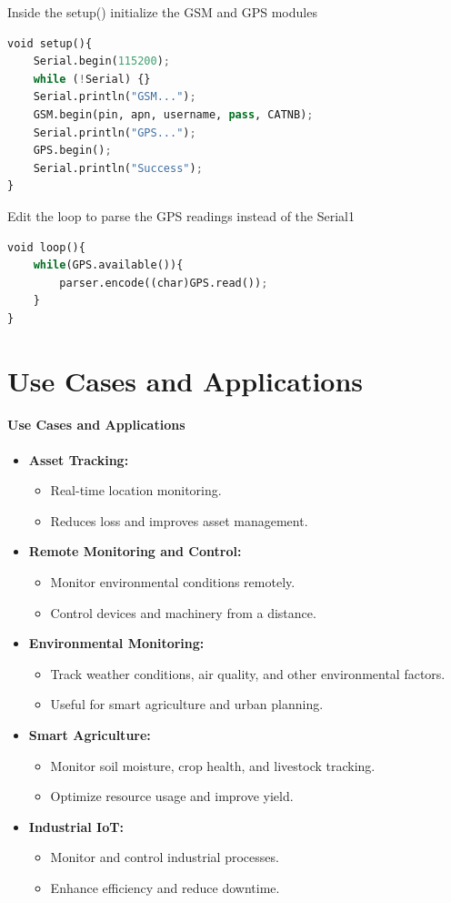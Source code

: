 \begin{frame}[fragile]{Inside the setup() initialize the GSM and GPS modules}
	
	\begin{lstlisting}[language=Python]
void setup(){
	Serial.begin(115200);
	while (!Serial) {}
	Serial.println("GSM...");
	GSM.begin(pin, apn, username, pass, CATNB);
	Serial.println("GPS...");
	GPS.begin();
	Serial.println("Success");
}
	\end{lstlisting}
\end{frame}

\begin{frame}[fragile]{Edit the loop to parse the GPS readings instead of the Serial1}
	
	\begin{lstlisting}[language=Python]
void loop(){
	while(GPS.available()){
		parser.encode((char)GPS.read());
	}
}
	\end{lstlisting}
\end{frame}


\section{Use Cases and Applications}
{
	\framesubtitle{Use Cases and Applications}
	\begin{itemize}
		\item \textbf{Asset Tracking:}
		\begin{itemize}
			\item Real-time location monitoring.
			\item Reduces loss and improves asset management.
		\end{itemize}
		\item \textbf{Remote Monitoring and Control:}
		\begin{itemize}
			\item Monitor environmental conditions remotely.
			\item Control devices and machinery from a distance.
		\end{itemize}
		\item \textbf{Environmental Monitoring:}
		\begin{itemize}
			\item Track weather conditions, air quality, and other environmental factors.
			\item Useful for smart agriculture and urban planning.
		\end{itemize}
		\item \textbf{Smart Agriculture:}
		\begin{itemize}
			\item Monitor soil moisture, crop health, and livestock tracking.
			\item Optimize resource usage and improve yield.
		\end{itemize}
		\item \textbf{Industrial IoT:}
		\begin{itemize}
			\item Monitor and control industrial processes.
			\item Enhance efficiency and reduce downtime.
		\end{itemize}
	\end{itemize}
}